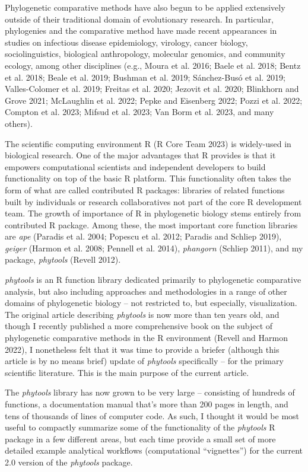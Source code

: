 \documentclass[fleqn,10pt,lineno]{wlpeerj} %
\begin{document}
Phylogenetic comparative methods have also begun to be applied extensively outside of their traditional domain of evolutionary research. In particular, phylogenies and the comparative method have made recent appearances in studies on infectious disease epidemiology, virology, cancer biology, sociolinguistics, biological anthropology, molecular genomics, and community ecology, among other disciplines (e.g., Moura et al. 2016; Baele et al. 2018; Bentz et al. 2018; Beale et al. 2019; Bushman et al. 2019; Sánchez-Busó et al. 2019; Valles-Colomer et al. 2019; Freitas et al. 2020; Jezovit et al. 2020; Blinkhorn and Grove 2021; McLaughlin et al. 2022; Pepke and Eisenberg 2022; Pozzi et al. 2022; Compton et al. 2023; Mifsud et al. 2023; Van Borm et al. 2023, and many others).

The scientific computing environment R (R Core Team 2023) is widely-used in biological research. One of the major advantages that R provides is that it empowers computational scientists and independent developers to build functionality on top of the basic R platform. This functionality often takes the form of what are called contributed R packages: libraries of related functions built by individuals or research collaboratives not part of the core R development team. The growth of importance of R in phylogenetic biology stems entirely from contributed R package. Among these, the most important core function libraries are \emph{ape} (Paradis et al. 2004; Popescu et al. 2012; Paradis and Schliep 2019), \emph{geiger} (Harmon et al. 2008; Pennell et al. 2014), \emph{phangorn} (Schliep 2011), and my package, \emph{phytools} (Revell 2012).

\emph{phytools} is an R function library dedicated primarily to phylogenetic comparative analysis, but also including approaches and methodologies in a range of other domains of phylogenetic biology -- not restricted to, but especially, visualization. The original article describing \emph{phytools} is now more than ten years old, and though I recently published a more comprehensive book on the subject of phylogenetic comparative methods in the R environment (Revell and Harmon 2022), I nonetheless felt that it was time to provide a briefer (although this article is by no means brief) update of \emph{phytools} specifically -- for the primary scientific literature. This is the main purpose of the current article.

The \emph{phytools} library has now grown to be very large -- consisting of hundreds of functions, a documentation manual that's more than 200 pages in length, and tens of thousands of lines of computer code. As such, I thought it would be most useful to compactly summarize some of the functionality of the \emph{phytools} R package in a few different areas, but each time provide a small set of more detailed example analytical workflows (computational ``vignettes'') for the current 2.0 version of the \emph{phytools} package.
\end{document}

